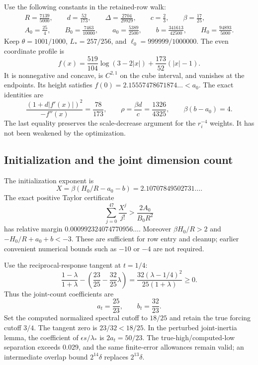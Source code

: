 \documentclass[11pt]{amsart}
\theoremstyle{remark}\newtheorem{remark}[theorem]{Remark}
\begin{document}
Use the following constants in the retained-row walk:
\begin{equation}\label{eq:finalparameters}
\begin{gathered}
 R=\frac{7139}{5000},\qquad d=\frac{52}{173},\qquad
 \Delta=\frac{2704}{29929},\qquad c=\frac23,\qquad
 \beta=\frac{17}{25},\\
 A_0=\frac{25}{4},\qquad B_0=\frac{7463}{10000},\qquad
 a_0=\frac{5389}{2500},\qquad b=\frac{341613}{42500},\qquad
 H_0=\frac{94893}{5000}.
\end{gathered}
\end{equation}
Keep $\theta=1001/1000$, $L_*=257/256$, and
$\ell_0=999999/1000000$.  The even coordinate profile is
\[
 f(x)=\frac{519}{104}\log(3-2|x|)
                       +\frac{173}{52}(|x|-1).
\]
It is nonnegative and concave, is $C^{2,1}$ on the cube interval, and
vanishes at the endpoints.  Its height satisfies
$f(0)=2.15557478671874\ldots<a_0$.  The exact identities are
\[
 \frac{(1+d|f'(x)|)^2}{-f''(x)}=\frac{78}{173},\qquad
 \rho=\frac{\beta d}{c}=\frac{1326}{4325},\qquad
 \beta(b-a_0)=4.
\]
The last equality preserves the scale-decrease argument for the
$r_i^{-4}$ weights.  It has not been weakened by the optimization.

\subsection{Initialization and the joint dimension count}
The initialization exponent is
\[
 X=\beta(H_0/R-a_0-b)=2.10707849502731\ldots.
\]
The exact positive Taylor certificate
\[
 \sum_{j=0}^{47}\frac{X^j}{j!}>\frac{2A_0}{B_0R^2}
\]
has relative margin $0.000992324074770956\ldots$.
Moreover $\beta H_0/R>2$ and $-H_0/R+a_0+b<-3$.
These are sufficient for row entry and cleanup; earlier convenient
numerical bounds such as $-10$ or $-4$ are not required.

Use the reciprocal-response tangent at $t=1/4$:
\[
 \frac{1-\lambda}{1+\lambda}
 -\left(\frac{23}{25}-\frac{32}{25}\lambda\right)
 =\frac{32(\lambda-1/4)^2}{25(1+\lambda)}\ge0.
\]
Thus the joint-count coefficients are
\[
 a_t=\frac{25}{23},\qquad b_t=\frac{32}{23}.
\]
Set the computed normalized spectral cutoff to $18/25$ and retain the
true forcing cutoff $3/4$.  The tangent zero is
$23/32<18/25$.  In the perturbed joint-inertia lemma, the coefficient
of $\epsilon s/\lambda_*$ is $2a_t=50/23$.
The true-high/computed-low separation exceeds $0.029$, and the same
finite-error allowances remain valid; an intermediate overlap bound
$2^{14}\delta$ replaces $2^{13}\delta$.
\end{document}
